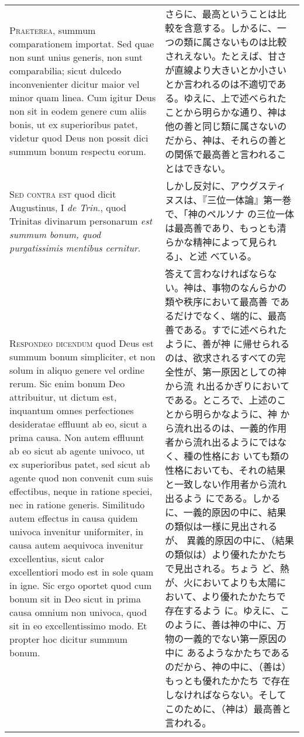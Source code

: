 \documentclass[10pt]{jsarticle} %
\begin{document}
\begin{longtable}{p{21em}p{21em}}
\\

{\scshape Praeterea}, summum comparationem importat. Sed quae non sunt unius
 generis, non sunt comparabilia; sicut dulcedo inconvenienter dicitur
 maior vel minor quam linea. Cum igitur Deus non sit in eodem genere cum
 aliis bonis, ut ex superioribus patet, videtur quod Deus non possit
 dici summum bonum respectu eorum.

&

さらに、最高ということは比較を含意する。しかるに、一つの類に属さないものは比較されえない。たとえば、甘さが直線より大きいとか小さいとか言われるのは不適切である。ゆえに、上で述べられたことから明らかな通り、神は他の善と同じ類に属さないのだから、神は、それらの善との関係で最高善と言われることはできない。

\\

{\scshape Sed contra est} quod dicit Augustinus, I {\itshape de Trin}.,
 quod Trinitas divinarum personarum {\itshape est summum bonum, quod
 purgatissimis mentibus cernitur}.

&

しかし反対に、アウグスティヌスは、『三位一体論』第一巻で、「神のペルソナ
 の三位一体は最高善であり、もっとも清らかな精神によって見られる」、と述
 べている。


\\

{\scshape Respondeo dicendum} quod Deus est summum bonum simpliciter, et
 non solum in aliquo genere vel ordine rerum. Sic enim bonum Deo
 attribuitur, ut dictum est, inquantum omnes perfectiones desideratae
 effluunt ab eo, sicut a prima causa. Non autem effluunt ab eo sicut ab
 agente univoco, ut ex superioribus patet, sed sicut ab agente quod non
 convenit cum suis effectibus, neque in ratione speciei, nec in ratione
 generis. Similitudo autem effectus in causa quidem univoca invenitur
 uniformiter, in causa autem aequivoca invenitur excellentius, sicut
 calor excellentiori modo est in sole quam in igne. Sic ergo oportet
 quod cum bonum sit in Deo sicut in prima causa omnium non univoca, quod
 sit in eo excellentissimo modo. Et propter hoc dicitur summum bonum.

&

答えて言わなければならない。神は、事物のなんらかの類や秩序において最高善
 であるだけでなく、端的に、最高善である。すでに述べられたように、善が神
 に帰せられるのは、欲求されるすべての完全性が、第一原因としての神から流
 れ出るかぎりにおいてである。ところで、上述のことから明らかなように、神
 から流れ出るのは、一義的作用者から流れ出るようにではなく、種の性格にお
 いても類の性格においても、それの結果と一致しない作用者から流れ出るよう
 にである。しかるに、一義的原因の中に、結果の類似は一様に見出されるが、
 異義的原因の中に、（結果の類似は）より優れたかたちで見出される。ちょう
 ど、熱が、火においてよりも太陽において、より優れたかたちで存在するよう
 に。ゆえに、このように、善は神の中に、万物の一義的でない第一原因の中に
 あるようなかたちであるのだから、神の中に、（善は）もっとも優れたかたち
 で存在しなければならない。そしてこのために、（神は）最高善と言われる。



\end{longtable}
\end{document}
